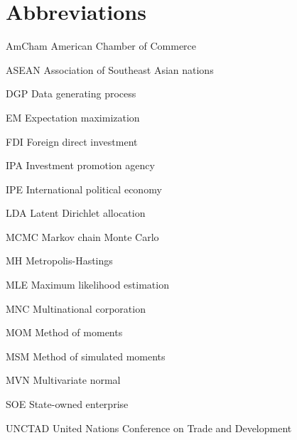\abbreviations





\section*{Abbreviations}

\begin{symbollist}
  \item[AmCham] American Chamber of Commerce
  \item[ASEAN] Association of Southeast Asian nations
  \item[DGP] Data generating process
  \item[EM] Expectation maximization
	\item[FDI] Foreign direct investment
  \item[IPA] Investment promotion agency
  \item[IPE] International political economy
  \item[LDA] Latent Dirichlet allocation
	\item[MCMC] Markov chain Monte Carlo
  \item[MH] Metropolis-Hastings
	\item[MLE] Maximum likelihood estimation
  \item[MNC] Multinational corporation
  \item[MOM] Method of moments
  \item[MSM] Method of simulated moments
  \item[MVN] Multivariate normal
  \item[SOE] State-owned enterprise
  \item[UNCTAD] United Nations Conference on Trade and Development
\end{symbollist}
